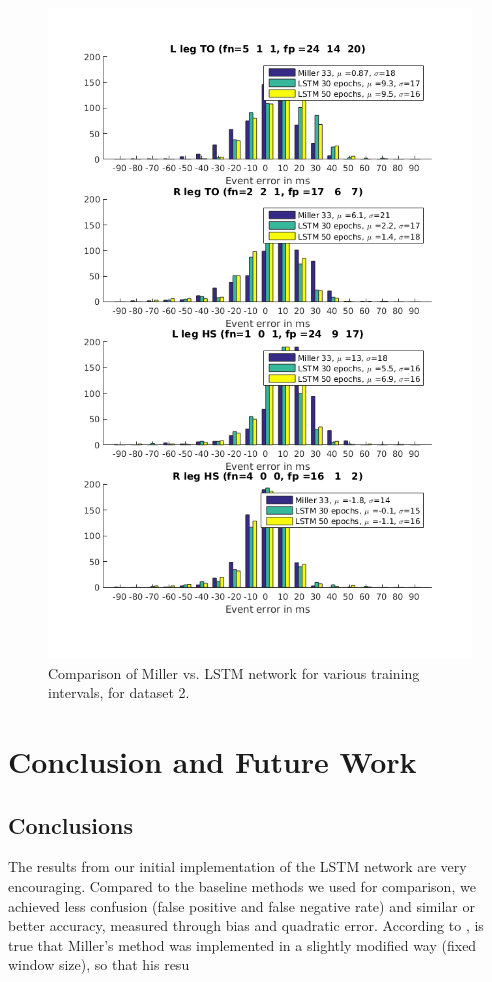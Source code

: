 \documentclass{acm_proc_article-sp}
\begin{document}
\begin{figure}[H]
 \centering
 \includegraphics[scale=.5]{./figures/Test2_1Train2_2Compare.png}
 \caption{Comparison of Miller vs. LSTM network for various training intervals, for dataset 2.}
 \label{fig:halfAndHalfUsers}
\end{figure}

\section{Conclusion and Future Work}
\label{sec:Conclusion and Future Work}
\subsection{Conclusions}
The results from our initial implementation of the LSTM network are very encouraging. Compared to the baseline methods we used for comparison, we achieved less confusion (false positive and false negative rate) and similar or better accuracy, measured through bias and quadratic error. According to \cite{Miller2009},  is true that Miller's method was implemented in a slightly modified way (fixed window size), so that his resu
\end{document}
